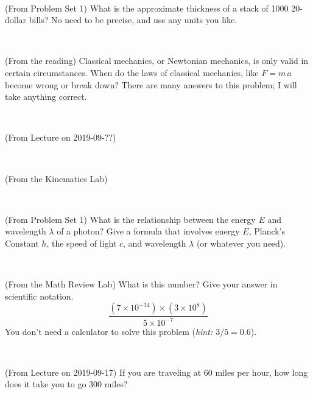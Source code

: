 \documentclass[12pt, letterpaper]{article}
\begin{document}
\vfill ~

\begin{problem} (From Problem Set 1)
What is the approximate thickness of a stack of 1000 20-dollar bills?
No need to be precise, and use any units you like.
\end{problem}


\vfill ~

\begin{problem} (From the reading)
Classical mechanics, or Newtonian mechanics, is only valid in certain
circumstances. When do the laws of classical mechanics, like $F =
m\,a$ become wrong or break down? There are many answers to this
problem; I will take anything correct.
\end{problem}


\vfill ~

\begin{problem} (From Lecture on 2019-09-??)
\end{problem}


\vfill ~


\clearpage


\begin{problem} (From the Kinematics Lab)

\end{problem}


\vfill ~

\begin{problem} (From Problem Set 1)
What is the relationship between the energy $E$ and wavelength
$\lambda$ of a photon? Give a formula that involves energy $E$,
Planck's Constant $h$, the speed of light $c$, and wavelength
$\lambda$ (or whatever you need).
\end{problem}

\vfill ~

\begin{problem} (From the Math Review Lab)
What is this number? Give your answer in scientific notation.
$$
\frac{(7\times10^{-34})\times(3\times10^8)}{5\times10^{-7}}
$$
You don't need a calculator to solve this problem (\textit{hint: $3/5=0.6$}).
\end{problem}


\vfill ~

\begin{problem} (From Lecture on 2019-09-17)
If you are traveling at 60 miles per hour, how long does
it take you to go 300 miles?
\end{problem}


\vfill ~
\end{document}

